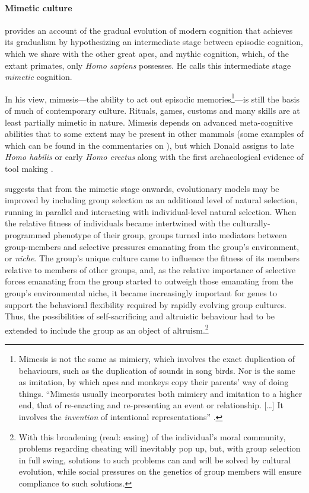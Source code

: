 \documentclass{article}
\begin{document}
\paragraph{Mimetic culture}

\citet{donald1991} provides an account of the gradual evolution of modern
cognition that achieves its gradualism by hypothesizing an intermediate stage
between episodic cognition, which we share with the other great apes, and
mythic cognition, which, of the extant primates, only \textit{Homo sapiens}
possesses. He calls this intermediate stage \textit{mimetic} cognition.

In his view, mimesis---the ability to act out episodic
memories\footnote{Mimesis is not the same as mimicry, which involves the exact
  duplication of behaviours, such as the duplication of sounds in song birds.
  Nor is the same as imitation, by which apes and monkeys copy their parents'
  way of doing things.  “Mimesis usually incorporates both mimicry and
  imitation to a higher end, that of re-enacting and re-presenting an event or
  relationship. [\ldots] It involves the \textit{invention} of intentional
  representations” \citep{donald1991}.}---is still the basis of much of
contemporary culture. Rituals, games, customs and many skills are at least
partially mimetic in nature. Mimesis depends on advanced meta-cognitive
abilities that to some extent may be present in other mammals (some examples
of which can be found in the commentaries on \citealp[pp.~755--756, 768,
771-772]{donald1993}), but which Donald assigns to late \textit{Homo habilis}
or early \textit{Homo erectus} along with the first archaeological evidence of
tool making \citep{donald1991,donald1993}.

\citet[pp.~254, 338]{donald2001} suggests that from the mimetic stage onwards,
evolutionary models may be improved by including group selection as an
additional level of natural selection, running in parallel and interacting with
individual-level natural selection.  When the relative fitness of individuals
became intertwined with the culturally-programmed phenotype of their group,
groups turned into mediators between group-members and selective pressures
emanating from the group's environment, or \emph{niche}. The group's unique
culture came to influence the fitness of its members relative to members of
other groups, and, as the relative importance of selective forces emanating
from the group started to outweigh those emanating from the group's
environmental niche, it became increasingly important for genes to support the
behavioral flexibility required by rapidly evolving group cultures. Thus, the
possibilities of self-sacrificing and altruistic behaviour had to be extended
to include the group as an object of altruism.\footnote{With this broadening
  (read: easing) of the individual's moral community, problems regarding
  cheating will inevitably pop up, but, with group selection in full swing,
solutions to such problems can and will be solved by cultural evolution, while
social pressures on the genetics of group members will ensure compliance to
such solutions.}
\end{document}
